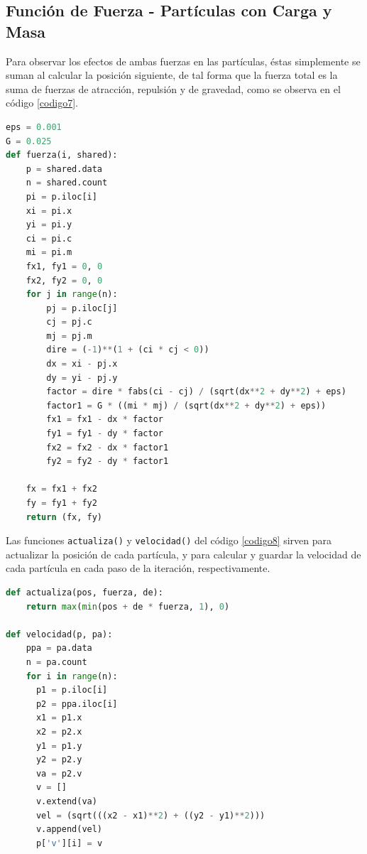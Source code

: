 \documentclass{report}
\begin{document}
\subsection{Funci\'on de Fuerza - Part\'iculas con Carga y Masa}

Para observar los efectos de ambas fuerzas en las part\'iculas, \'estas simplemente se suman al calcular la posici\'on siguiente, de tal forma que la fuerza total es la suma de fuerzas de atracci\'on, repulsi\'on y de gravedad, como se observa en el c\'odigo \ref{codigo7}.

\begin{lstlisting}[caption= Fuerza Aplicada a Part\'iculas con Carga y Masa, label=codigo7, language=Python]
eps = 0.001
G = 0.025
def fuerza(i, shared):
    p = shared.data
    n = shared.count
    pi = p.iloc[i]
    xi = pi.x
    yi = pi.y
    ci = pi.c
    mi = pi.m
    fx1, fy1 = 0, 0
    fx2, fy2 = 0, 0
    for j in range(n):
        pj = p.iloc[j]
        cj = pj.c
        mj = pj.m
        dire = (-1)**(1 + (ci * cj < 0))
        dx = xi - pj.x
        dy = yi - pj.y
        factor = dire * fabs(ci - cj) / (sqrt(dx**2 + dy**2) + eps)
        factor1 = G * ((mi * mj) / (sqrt(dx**2 + dy**2) + eps))
        fx1 = fx1 - dx * factor
        fy1 = fy1 - dy * factor
        fx2 = fx2 - dx * factor1
        fy2 = fy2 - dy * factor1
    
    fx = fx1 + fx2
    fy = fy1 + fy2
    return (fx, fy)
\end{lstlisting}

\newpage

Las funciones \texttt{actualiza()} y \texttt{velocidad()} del c\'odigo \ref{codigo8} sirven para actualizar la posici\'on de cada part\'icula, y para calcular y guardar la velocidad de cada part\'icula en cada paso de la iteraci\'on, respectivamente.

\begin{lstlisting}[caption= Actualizaci\'on de  Posici\'on y C\'alculo de Velocidad, label=codigo8, language=Python]
def actualiza(pos, fuerza, de):
    return max(min(pos + de * fuerza, 1), 0)

def velocidad(p, pa):
    ppa = pa.data
    n = pa.count
    for i in range(n):
      p1 = p.iloc[i]
      p2 = ppa.iloc[i]
      x1 = p1.x
      x2 = p2.x
      y1 = p1.y
      y2 = p2.y
      va = p2.v
      v = []
      v.extend(va)
      vel = (sqrt(((x2 - x1)**2) + ((y2 - y1)**2)))
      v.append(vel)
      p['v'][i] = v
\end{lstlisting}
\end{document}
